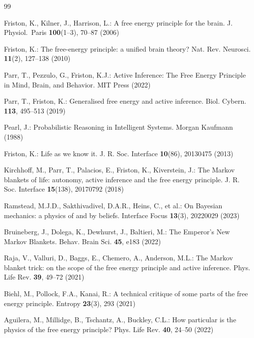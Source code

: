 \documentclass[runningheads]{llncs}
\begin{document}

\begin{thebibliography}{99}

Friston, K., Kilner, J., Harrison, L.: A free energy principle for the brain. J. Physiol.\ Paris \textbf{100}(1--3), 70--87 (2006)

Friston, K.: The free-energy principle: a unified brain theory? Nat. Rev. Neurosci. \textbf{11}(2), 127--138 (2010)

Parr, T., Pezzulo, G., Friston, K.J.: Active Inference: The Free Energy Principle in Mind, Brain, and Behavior. MIT Press (2022)

Parr, T., Friston, K.: Generalised free energy and active inference. Biol. Cybern. \textbf{113}, 495--513 (2019)

Pearl, J.: Probabilistic Reasoning in Intelligent Systems. Morgan Kaufmann (1988)

Friston, K.: Life as we know it. J. R. Soc. Interface \textbf{10}(86), 20130475 (2013)

Kirchhoff, M., Parr, T., Palacios, E., Friston, K., Kiverstein, J.: The Markov blankets of life: autonomy, active inference and the free energy principle. J. R. Soc. Interface \textbf{15}(138), 20170792 (2018)

Ramstead, M.J.D., Sakthivadivel, D.A.R., Heins, C., et al.: On Bayesian mechanics: a physics of and by beliefs. Interface Focus \textbf{13}(3), 20220029 (2023)

Bruineberg, J., Dolega, K., Dewhurst, J., Baltieri, M.: The Emperor's New Markov Blankets. Behav. Brain Sci. \textbf{45}, e183 (2022)

Raja, V., Valluri, D., Baggs, E., Chemero, A., Anderson, M.L.: The Markov blanket trick: on the scope of the free energy principle and active inference. Phys. Life Rev. \textbf{39}, 49--72 (2021)

Biehl, M., Pollock, F.A., Kanai, R.: A technical critique of some parts of the free energy principle. Entropy \textbf{23}(3), 293 (2021)

Aguilera, M., Millidge, B., Tschantz, A., Buckley, C.L.: How particular is the physics of the free energy principle? Phys. Life Rev. \textbf{40}, 24--50 (2022)


\end{thebibliography}
\end{document}
